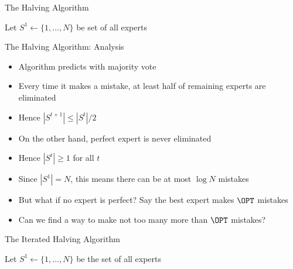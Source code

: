 \documentclass[11pt,aspectratio=169,handout]{beamer}
\begin{document}
  
  \begin{frame}{The Halving Algorithm}
   \begin{algorithm*}[H]
    Let $S^1 \leftarrow \{1,\ldots,N\}$ be set of all experts\;
   \end{algorithm*}
  \end{frame}
  
  
  \begin{frame}{The Halving Algorithm: Analysis}
   \begin{itemize}[<+->]
   \setlength{\itemsep}{0.7em}
    \item Algorithm predicts with majority vote
    \item Every time it makes a mistake, at least half of remaining experts are eliminated
    \item Hence $|S^{t+1}| \leq |S^t|/2$
    \item On the other hand, perfect expert is never eliminated
    \item Hence $|S^t| \geq 1$ for all $t$
    \item Since $|S^1| = N$, this means there can be at most $\log N$ mistakes
    \item But what if no expert is perfect? Say the best expert makes $\OPT$ mistakes
    \item Can we find a way to make not too many more than $\OPT$ mistakes?
   \end{itemize}
  \end{frame}
  
  
  \begin{frame}{The Iterated Halving Algorithm}
   \begin{algorithm*}[H]
    Let $S^1 \leftarrow \{1,\ldots,N\}$ be the set of all experts\;
   \end{algorithm*}
  \end{frame}
  
\end{document}
